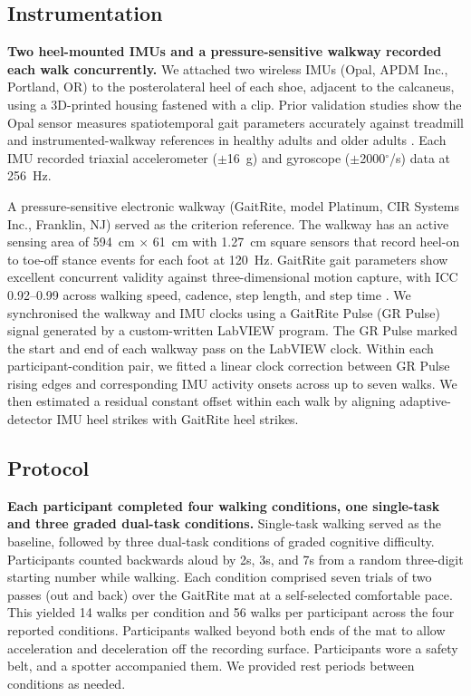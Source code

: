\documentclass[fleqn,10pt,lineno]{wlpeerj}
\newcommand{\dps}{$^{\circ}$/s}
\begin{document}
\subsection{Instrumentation}

\textbf{Two heel-mounted IMUs and a pressure-sensitive walkway recorded each walk concurrently.}
We attached two wireless IMUs (Opal, APDM Inc., Portland, OR) to the posterolateral heel of each shoe, adjacent to the calcaneus, using a 3D-printed housing fastened with a clip. Prior validation studies show the Opal sensor measures spatiotemporal gait parameters accurately against treadmill and instrumented-walkway references in healthy adults and older adults \citep{Washabaugh2017, Morris2019}. Each IMU recorded triaxial accelerometer ($\pm$16~g) and gyroscope ($\pm$2000\dps) data at 256~Hz.

A pressure-sensitive electronic walkway (GaitRite, model Platinum, CIR Systems Inc., Franklin, NJ) served as the criterion reference. The walkway has an active sensing area of 594~cm $\times$ 61~cm with 1.27~cm square sensors that record heel-on to toe-off stance events for each foot at 120~Hz. GaitRite gait parameters show excellent concurrent validity against three-dimensional motion capture, with ICC 0.92--0.99 across walking speed, cadence, step length, and step time \citep{Webster2005}. We synchronised the walkway and IMU clocks using a GaitRite Pulse (GR Pulse) signal generated by a custom-written LabVIEW program. The GR Pulse marked the start and end of each walkway pass on the LabVIEW clock. Within each participant-condition pair, we fitted a linear clock correction between GR Pulse rising edges and corresponding IMU activity onsets across up to seven walks. We then estimated a residual constant offset within each walk by aligning adaptive-detector IMU heel strikes with GaitRite heel strikes.

\subsection{Protocol}

\textbf{Each participant completed four walking conditions, one single-task and three graded dual-task conditions.}
Single-task walking served as the baseline, followed by three dual-task conditions of graded cognitive difficulty. Participants counted backwards aloud by 2s, 3s, and 7s from a random three-digit starting number while walking. Each condition comprised seven trials of two passes (out and back) over the GaitRite mat at a self-selected comfortable pace. This yielded 14 walks per condition and 56 walks per participant across the four reported conditions. Participants walked beyond both ends of the mat to allow acceleration and deceleration off the recording surface. Participants wore a safety belt, and a spotter accompanied them. We provided rest periods between conditions as needed.
\end{document}
